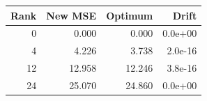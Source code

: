 \begin{tabular}{rrrr}
\toprule
Rank & New MSE & Optimum & Drift \\
\midrule
0 & 0.000 & 0.000 & 0.0e+00 \\
4 & 4.226 & 3.738 & 2.0e-16 \\
12 & 12.958 & 12.246 & 3.8e-16 \\
24 & 25.070 & 24.860 & 0.0e+00 \\
\bottomrule
\end{tabular}
